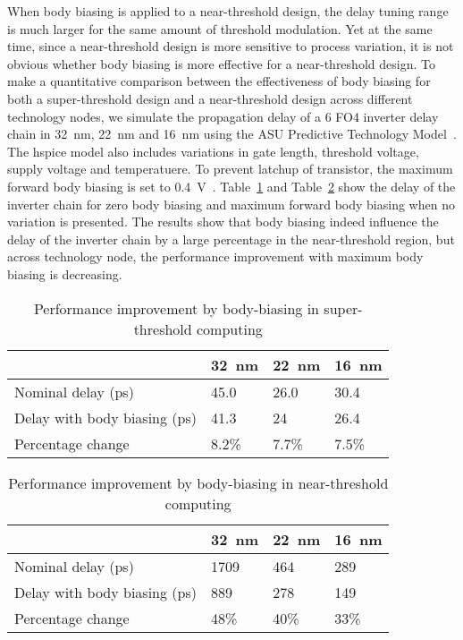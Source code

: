 When body biasing is applied to a near-threshold design, the delay tuning range is much larger for the same amount of threshold modulation.
Yet at the same time, since a near-threshold design is more sensitive to process variation, it is not obvious whether body biasing is more effective for a near-threshold design.
To make a quantitative comparison between the effectiveness of body biasing for both a super-threshold design and a near-threshold design across different technology nodes, we simulate the propagation delay of a 6 FO4 inverter delay chain in \SI{32}{\nano\meter}, \SI{22}{\nano\meter} and \SI{16}{\nano\meter} using the ASU Predictive Technology Model~\cite{PredictiveModel}.
The hspice model also includes variations in gate length, threshold voltage, supply voltage and temperatuere. To prevent latchup of transistor,  the maximum forward body biasing is set to \SI{0.4}{\volt}~\cite{Body Biasing2}.
Table~\ref{tbl:body1} and Table~\ref{tbl:body2} show the delay of the inverter chain for zero body biasing and maximum forward body biasing when no variation is presented.
The results show that body biasing indeed influence the delay of the inverter chain by a large percentage in the near-threshold region, but across technology node, the performance improvement with maximum body biasing is decreasing.

\begin{table}
  \caption{Performance improvement by body-biasing in super-threshold computing} 
  \centering 
  \label{tbl:body1}
  \begin{tabular}{ | l | l | l | l | }
    \hline
    & \SI{32}{\nano\meter} & \SI{22}{\nano\meter} & \SI{16}{\nano\meter} \\ \hline
    Nominal delay (ps) & 45.0 & 26.0 & 30.4 \\ \hline
    Delay with body biasing (ps)  & 41.3 & 24 & 26.4 \\  \hline
    Percentage change  & 8.2\% & 7.7\% & 7.5\% \\ 
    \hline
  \end{tabular}
\end{table}



\begin{table}
  \caption {Performance improvement by body-biasing in near-threshold computing}  
  \centering
  \label{tbl:body2}
  \begin{tabular}{ | l | l | l | l | }
    \hline
    & \SI{32}{\nano\meter} & \SI{22}{\nano\meter} & \SI{16}{\nano\meter} \\ \hline
    Nominal delay (ps) & 1709 & 464 & 289 \\ \hline
    Delay with body biasing (ps)  & 889 & 278 & 149 \\  \hline
    Percentage change  & 48\% & 40\% & 33\% \\ 
    \hline
  \end{tabular}
\end{table}

